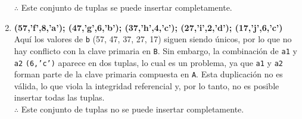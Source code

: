 \begin{enumerate}
    $\therefore$ Este conjunto de tuplas se puede insertar completamente.

    \item \textbf{(57,’f’,8,’a’); (47,’g’,6,’b’); (37,’h’,4,’c’); (27,’i’,2,’d’); (17,’j’,6,’c’)} \\
    
    Aquí los valores de \texttt{b} (57, 47, 37, 27, 17) siguen siendo únicos, por lo que no hay conflicto con la clave primaria en \texttt{B}. Sin embargo, la combinación de \texttt{a1} y \texttt{a2} \texttt{(6,'c')} aparece en dos tuplas, lo cual es un problema, ya que \texttt{a1} y \texttt{a2} forman parte de la clave primaria compuesta en \texttt{A}. Esta duplicación no es válida, lo que viola la integridad referencial y, por lo tanto, no es posible insertar todas las tuplas. \\

    $\therefore$ Este conjunto de tuplas no se puede insertar completamente.
\end{enumerate}
